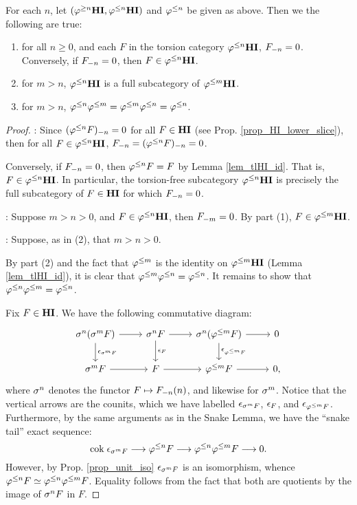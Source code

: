\begin{prop}\label{prop_TFHI_properties}
For each $n$, let $(\THI{n}, \TFHI{n})$ and $\tlHI{n}$ be given
as above. Then we the following are true:

\begin{enumerate}
\item for all $n \geq 0$, and each $F$ in the torsion category 
$\TFHI{n}$, $\RHI[n] F = 0$. Conversely, if $\RHI[n] F = 0$, then
$F \in \TFHI{n}$.
\tinyskip

\item for $m > n$, $\TFHI{n}$ is a full subcategory of $\TFHI{m}$.
\tinyskip

\item for $m > n$, $\tlHI{n}\tlHI{m} = \tlHI{m}\tlHI{n} = \tlHI{n}$.
\tinyskip
\end{enumerate}
\end{prop}
\begin{proof}
 : Since $\RHI[n]{(\tlHI{n} F)} = 0$ for all $F \in 
\HI$ (see Prop. \ref{prop_HI_lower_slice}), then for all $F \in 
\TFHI{n}$, $\RHI[n]{F} = \RHI[n]{(\tlHI{n} F)} = 0$.

Conversely, if $\RHI[n]{F} = 0$, then $\tlHI{n} F = F$ by Lemma
\ref{lem_tlHI_id}. That is, $F \in \TFHI{n}$. In particular, the
torsion-free subcategory $\TFHI{n}$ is precisely the full 
subcategory of $F \in \HI$ for which $\RHI[n]{F} = 0$.

 : Suppose $m > n > 0$, and $F \in \TFHI{n}$, then
$\RHI[m]{F} = 0$. By part (1), $F \in \TFHI{m}$.

 : Suppose, as in (2), that $m > n > 0$.

By part (2) and the fact that $\tlHI{m}$ is the identity on 
$\TFHI{m}$ (Lemma \ref{lem_tlHI_id}), it is clear that 
$\tlHI{m}\tlHI{n} = \tlHI{n}$. It remains to show that 
$\tlHI{n}\tlHI{m} = \tlHI{n}$.

Fix $F \in \HI$. We have the following commutative diagram:
\[
\begin{tikzcd}
\sgHI{n}(\sgHI{m} F) \arrow{r}\arrow{d}{\cuHI_{\sgHI{m} F}} &
\sgHI{n} F \arrow{r}\arrow{d}{\cuHI_F} &
\sgHI{n}(\tlHI{m} F) \arrow{r}\arrow{d}{\cuHI_{\tlHI{m}F}} &
0 \\
\sgHI{m} F \arrow{r} &
F \arrow{r} &
\tlHI{m} F \arrow{r}&
0,
\end{tikzcd}
\]
where $\sgHI{n}$ denotes the functor $F \mapsto 
\LHI[n]{\RHI[n]{F}}$, and likewise for $\sgHI{m}$. Notice that the 
vertical arrows are the counits, which we have labelled 
$\cuHI_{\sgHI{m}F}$, $\cuHI_F$, and $\cuHI_{\tlHI{m}F}$. 
Furthermore, by the same arguments as in the Snake Lemma, we have 
the ``snake tail'' exact sequence:
\[
\cok \cuHI_{\sgHI{m}F} \to \tlHI{n}F \to \tlHI{n}\tlHI{m}F \to 0.
\]
However, by Prop. \ref{prop_unit_iso} $\cuHI_{\sgHI{m} F}$ is an 
isomorphism, whence $\tlHI{n}F \simeq \tlHI{n}\tlHI{m} F$. 
Equality follows from the fact that both are quotients by the 
image of $\sgHI{n} F$ in $F$.
\end{proof}

